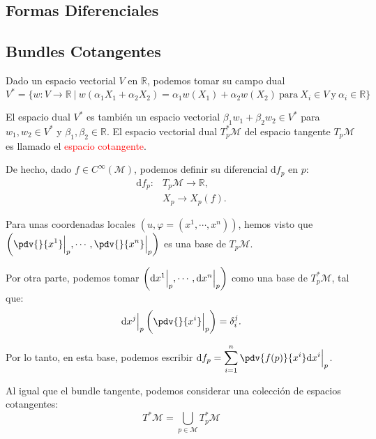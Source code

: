 \documentclass[../main]{subfiles}
\begin{document}
\begin{adjustwidth}{0pt}{-100pt}
\section{Formas Diferenciales}\label{part1.4}
\subsection{Bundles Cotangentes}
Dado un espacio vectorial $V$ en $\mathbb{R}$, podemos tomar su campo dual 
\begin{equation}
    V^{*}=\{w: V\rightarrow \mathbb{R}\ | \ w(\alpha_1 X_1+\alpha_2 X_2)=\alpha_1 w(X_1)+\alpha_2 w(X_2) \ \text{para} \ X_i \in V \ \text{y} \ \alpha_i \in \mathbb{R}\}
\end{equation}

El espacio dual $V^{*}$ es también un espacio vectorial $\beta_1 w_1+\beta_2 w_2 \in V^{*}$ para $w_1, w_2 \in V^{*}$ y $\beta_1, \beta_2 \in \mathbb{R}$. El espacio vectorial dual $T^{*}_p \mathcal{M}$ del espacio tangente $T_p \mathcal{M}$ es llamado el \textcolor{red}{espacio cotangente}.

De hecho, dado $f \in C^{\infty}(\mathcal{M})$, podemos definir su diferencial $\mathrm{d}f_p$ en $p$:
\begin{equation}
    \begin{split}
        \mathrm{d}f_p:& T_p \mathcal{M} \rightarrow \mathbb{R},\\
        & X_p \rightarrow X_p(f).
    \end{split}
\end{equation}

Para unas coordenadas locales $(u, \varphi=(x^1, \cdots, x^n))$, hemos visto que $\displaystyle \left(\pdv{}{x^1}\Big{|}_p, \cdots, \pdv{}{x^n}\Big{|}_p\right)$ es una base de $T_p\mathcal{M}$.

Por otra parte, podemos tomar $\left(\mathrm{d}x^1\Big{|}_p, \cdots, \mathrm{d}x^n\Big{|}_p\right)$ como una base de $T^{*}_p \mathcal{M}$, tal que: 
\begin{equation}
    \mathrm{d}x^j\Big{|}_p \left(\pdv{}{x^{i}}\Big{|}_p\right)=\delta^j_i.
\end{equation}

Por lo tanto, en esta base, podemos escribir $\displaystyle\mathrm{d}f_p=\sum_{i=1}^n \pdv{f(p)}{x^{i}}\mathrm{d}x^{i}\Big{|}_p$.

Al igual que el bundle tangente, podemos considerar una colección de espacios cotangentes:
\begin{equation}
    T^{*}\mathcal{M}=\bigcup_{p \in \mathcal{M}} T^{*}_p \mathcal{M}
\end{equation}


\end{adjustwidth}
\end{document}
